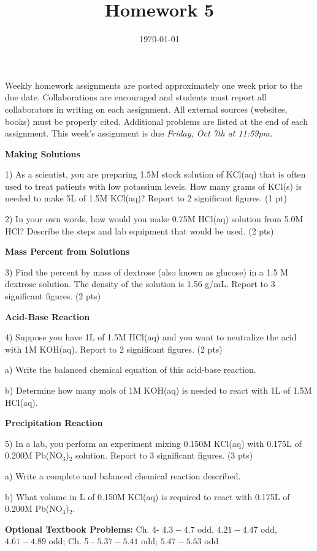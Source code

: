 \documentclass[12pt]{article}
\title{\textbf{Homework 5}}
\date{\vspace{-2em}\today}
\begin{document}
\maketitle 

Weekly homework assignments are posted approximately one week prior to the
due date. Collaborations are encouraged and students must report all collaborators
in writing on each assignment. All external sources (websites, books) must be
properly cited. Additional problems are listed at the end of each assignment.
This week's assignment is due \textit{Friday, Oct 7th at 11:59pm.}

\textbf{Making Solutions}

1) As a scientist, you are preparing 1.5M stock solution of KCl(aq) that is often used to
treat patients with low potassium levels. How many grams of KCl(s) is needed to make
5L of 1.5M KCl(aq)? Report to 2 significant figures. (1 pt)

\vspace{1in}

2) In your own words, how would you make 0.75M HCl(aq) solution from 5.0M HCl? Describe
the steps and lab equipment that would be used. (2 pts)

\vspace{1in}

\textbf{Mass Percent from Solutions}

3) Find the percent by mass of dextrose (also known as glucose) in a 1.5 M dextrose solution.
The density of the solution is 1.56 g/mL. Report to 3 significant figures. (2 pts)

\vfill

\newpage

\textbf{Acid-Base Reaction}

4) Suppose you have 1L of 1.5M HCl(aq) and you want to neutralize the acid with 1M
KOH(aq). Report to 2 significant figures. (2 pts)

a) Write the balanced chemical equation of this acid-base reaction.

b) Determine how many mols of 1M KOH(aq) is needed to react with 1L of 1.5M HCl(aq).

\vspace{2.5in}

\textbf{Precipitation Reaction}

5) In a lab, you perform an experiment mixing 0.150M KCl(aq) with 0.175L of 0.200M Pb(NO$_3$)$_2$
solution. Report to 3 significant figures. (3 pts)

a) Write a complete and balanced chemical reaction described.

b) What volume in L of 0.150M KCl(aq) is required to react with 0.175L of 0.200M Pb(NO$_3$)$_2$.

\vfill

\textbf{Optional Textbook Problems:} Ch. 4- $4.3-4.7$ odd, $4.21-4.47$ odd, $4.61-4.89$ odd;
Ch. 5 - $5.37 - 5.41$ odd; $5.47 - 5.53$ odd
\end{document}
